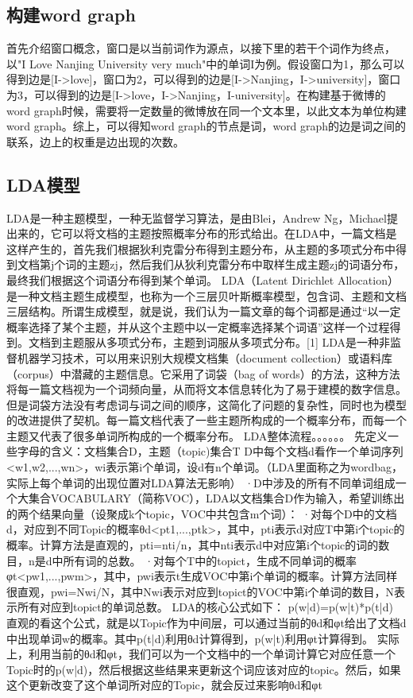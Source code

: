 \documentclass[master]{njuthesis}
\begin{document}
\subsection{构建word graph}

    首先介绍窗口概念，窗口是以当前词作为源点，以接下里的若干个词作为终点，以"I Love Nanjing University very much"中的单词I为例。假设窗口为1，那么可以得到边是[I->love]，窗口为2，可以得到的边是[I->Nanjing，I->university]，窗口为3，可以得到的边是[I->love，I->Nanjing，I-university]。在构建基于微博的word graph时候，需要将一定数量的微博放在同一个文本里，以此文本为单位构建word graph。综上，可以得知word graph的节点是词，word graph的边是词之间的联系，边上的权重是边出现的次数。
 
\subsection{LDA模型}

LDA是一种主题模型，一种无监督学习算法，是由Blei，Andrew Ng，Michael提出来的，它可以将文档的主题按照概率分布的形式给出。在LDA中，一篇文档是这样产生的，首先我们根据狄利克雷分布得到主题分布，从主题的多项式分布中得到文档第j个词的主题zj，然后我们从狄利克雷分布中取样生成主题zj的词语分布，最终我们根据这个词语分布得到某个单词。
LDA（Latent Dirichlet Allocation）是一种文档主题生成模型，也称为一个三层贝叶斯概率模型，包含词、主题和文档三层结构。所谓生成模型，就是说，我们认为一篇文章的每个词都是通过“以一定概率选择了某个主题，并从这个主题中以一定概率选择某个词语”这样一个过程得到。文档到主题服从多项式分布，主题到词服从多项式分布。[1] 
LDA是一种非监督机器学习技术，可以用来识别大规模文档集（document collection）或语料库（corpus）中潜藏的主题信息。它采用了词袋（bag of words）的方法，这种方法将每一篇文档视为一个词频向量，从而将文本信息转化为了易于建模的数字信息。但是词袋方法没有考虑词与词之间的顺序，这简化了问题的复杂性，同时也为模型的改进提供了契机。每一篇文档代表了一些主题所构成的一个概率分布，而每一个主题又代表了很多单词所构成的一个概率分布。
LDA整体流程。。。。。。
先定义一些字母的含义：文档集合D，主题（topic)集合T
D中每个文档d看作一个单词序列<w1,w2,...,wn>，wi表示第i个单词，设d有n个单词。（LDA里面称之为wordbag，实际上每个单词的出现位置对LDA算法无影响）
·D中涉及的所有不同单词组成一个大集合VOCABULARY（简称VOC），LDA以文档集合D作为输入，希望训练出的两个结果向量（设聚成k个topic，VOC中共包含m个词）：
·对每个D中的文档d，对应到不同Topic的概率θd<pt1,...,ptk>，其中，pti表示d对应T中第i个topic的概率。计算方法是直观的，pti=nti/n，其中nti表示d中对应第i个topic的词的数目，n是d中所有词的总数。
·对每个T中的topict，生成不同单词的概率φt<pw1,...,pwm>，其中，pwi表示t生成VOC中第i个单词的概率。计算方法同样很直观，pwi=Nwi/N，其中Nwi表示对应到topict的VOC中第i个单词的数目，N表示所有对应到topict的单词总数。
LDA的核心公式如下：
p(w|d)=p(w|t)*p(t|d)
直观的看这个公式，就是以Topic作为中间层，可以通过当前的θd和φt给出了文档d中出现单词w的概率。其中p(t|d)利用θd计算得到，p(w|t)利用φt计算得到。
实际上，利用当前的θd和φt，我们可以为一个文档中的一个单词计算它对应任意一个Topic时的p(w|d)，然后根据这些结果来更新这个词应该对应的topic。然后，如果这个更新改变了这个单词所对应的Topic，就会反过来影响θd和φt
\end{document}
